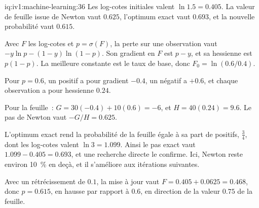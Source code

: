 \begin{solution}{iq:iv1:machine-learning:36}
Les log-cotes initiales valent $\ln 1.5 = 0.405$. La valeur de feuille issue de Newton vaut $0.625$, l'optimum exact vaut $0.693$, et la nouvelle probabilité vaut $0.615$.

Avec $F$ les log-cotes et $p = \sigma(F)$, la perte sur une observation vaut $-y\ln p - (1 - y)\ln(1 - p)$. Son gradient en $F$ est $p - y$, et sa hessienne est $p(1 - p)$. La meilleure constante est le taux de base, donc $F_0 = \ln(0.6/0.4)$.

Pour $p = 0.6$, un positif a pour gradient $-0.4$, un négatif a $+0.6$, et chaque observation a pour hessienne $0.24$.

Pour la feuille~: $G = 30(-0.4) + 10(0.6) = -6$, et $H = 40(0.24) = 9.6$. Le pas de Newton vaut $-G/H = 0.625$.

L'optimum exact rend la probabilité de la feuille égale à sa part de positifs, $\frac34$, dont les log-cotes valent $\ln 3 = 1.099$. Ainsi le pas exact vaut $1.099 - 0.405 = 0.693$, et une recherche directe le confirme. Ici, Newton reste environ 10~\% en deçà, et il s'améliore aux itérations suivantes.

Avec un rétrécissement de $0.1$, la mise à jour vaut $F = 0.405 + 0.0625 = 0.468$, donc $p = 0.615$, en hausse par rapport à $0.6$, en direction de la valeur $0.75$ de la feuille.



\end{solution}

